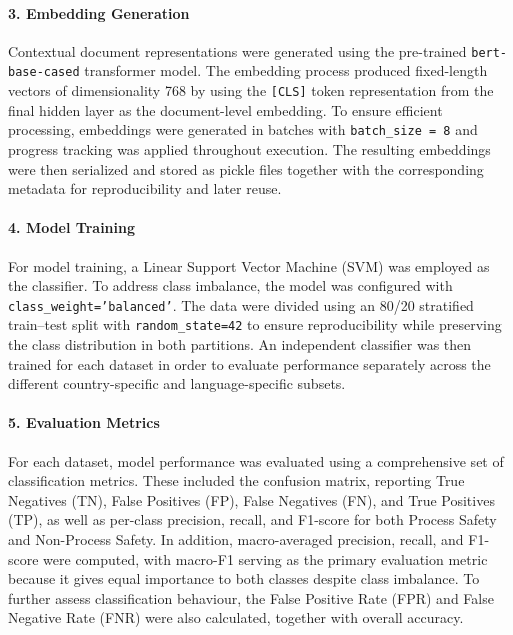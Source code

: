 \documentclass[11pt, titlepage, bibliography=totoc]{scrreprt}
\begin{document}
\paragraph{3. Embedding Generation}
Contextual document representations were generated using the pre-trained \texttt{bert-base-cased} transformer model. The embedding process produced fixed-length vectors of dimensionality 768 by using the \texttt{[CLS]} token representation from the final hidden layer as the document-level embedding. To ensure efficient processing, embeddings were generated in batches with \texttt{batch\_size = 8} and progress tracking was applied throughout execution. The resulting embeddings were then serialized and stored as pickle files together with the corresponding metadata for reproducibility and later reuse.

\paragraph{4. Model Training}
For model training, a Linear Support Vector Machine (SVM) was employed as the classifier. To address class imbalance, the model was configured with \texttt{class\_weight='balanced'}. The data were divided using an 80/20 stratified train--test split with \texttt{random\_state=42} to ensure reproducibility while preserving the class distribution in both partitions. An independent classifier was then trained for each dataset in order to evaluate performance separately across the different country-specific and language-specific subsets.

\paragraph{5. Evaluation Metrics}
For each dataset, model performance was evaluated using a comprehensive set of classification metrics. These included the confusion matrix, reporting True Negatives (TN), False Positives (FP), False Negatives (FN), and True Positives (TP), as well as per-class precision, recall, and F1-score for both Process Safety and Non-Process Safety. In addition, macro-averaged precision, recall, and F1-score were computed, with macro-F1 serving as the primary evaluation metric because it gives equal importance to both classes despite class imbalance. To further assess classification behaviour, the False Positive Rate (FPR) and False Negative Rate (FNR) were also calculated, together with overall accuracy.
\end{document}

